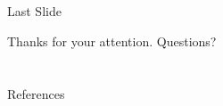 
\section*{}

\begin{frame}{Last Slide}

{\centering

Thanks for your attention. Questions?

}

\end{frame}

\section*{}

\begin{frame}[allowframebreaks]{References}
\footnotesize


\end{frame}






